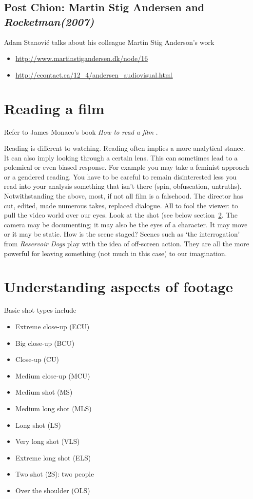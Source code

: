 \subsection{Post Chion: Martin Stig Andersen and \textit{Rocketman(2007)}}
Adam Stanovi\'c talks about his colleague Martin Stig Anderson's work
\begin{itemize}
\item \url{http://www.martinstigandersen.dk/node/16}
\item \url{http://econtact.ca/12_4/andersen_audiovisual.html}
\end{itemize}

\section{Reading a film}
Refer to James Monaco's book \textit{How to read a film} \citep{monaco2000read}. 

Reading is different to watching. Reading often implies a more analytical stance. It can also imply looking through a certain lens. This can sometimes lead to a polemical or even biased response. For example you may take a feminist approach or a gendered reading. You have to be careful to remain disinterested less you read into your analysis something that isn't there (spin, obfuscation, untruths).
Notwithstanding the above, most, if not all film is a falsehood. The director has cut, edited, made numerous takes, replaced dialogue. All to fool the viewer: to pull the video world over our eyes. Look at the shot (see below section~\ref{aspects_of_footage}. The camera may be documenting; it may also be the eyes of a character. It may move or it may be static. How is the scene staged? Scenes such as `the interrogation' from \textit{Reservoir Dogs} play with the idea of off-screen action. They are all the more powerful for leaving something (not much in this case) to our imagination. 

\section{Understanding aspects of footage}
\label{aspects_of_footage}
Basic shot types include
\begin{itemize}
\item Extreme close-up (ECU)
\item Big close-up (BCU)
\item Close-up (CU)
\item Medium close-up (MCU)
\item Medium shot (MS)
\item Medium long shot (MLS)
\item Long shot (LS)
\item Very long shot (VLS)
\item Extreme long shot (ELS)
\item Two shot (2S): two people
\item Over the shoulder (OLS)
\end{itemize}

